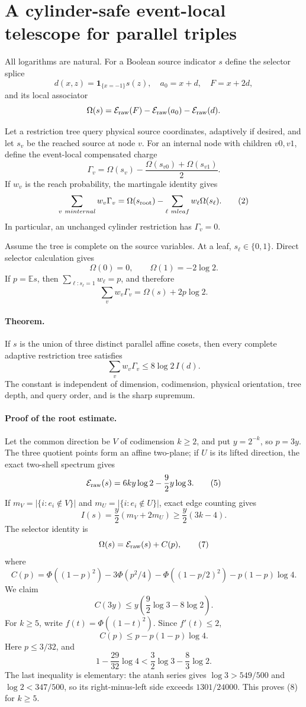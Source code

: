 \section*{A cylinder-safe event-local telescope for parallel triples}

All logarithms are natural.  For a Boolean source indicator $s$ define the
selector splice
\[
 d(x,z)=\mathbf1_{\{x=-1\}}s(z),\quad a_0=x+d,\quad F=x+2d,
\]
and its local associator
\[
 \Omega(s)=\mathcal E_{\rm raw}(F)
 -\mathcal E_{\rm raw}(a_0)-\mathcal E_{\rm raw}(d).
\]

Let a restriction tree query physical source coordinates, adaptively if
desired, and let $s_v$ be the reached source at node $v$.  For an internal
node with children $v0,v1$, define the event-local compensated charge
\[
 \Gamma_v=\Omega(s_v)-\frac{\Omega(s_{v0})+\Omega(s_{v1})}{2}. \tag{1}
\]
If $w_v$ is the reach probability, the martingale identity gives
\[
 \sum_{v\ {
m internal}}w_v\Gamma_v
 =\Omega(s_{\rm root})-\sum_{\ell\ {
m leaf}}w_\ell\Omega(s_\ell).
                                                                    \tag{2}
\]
In particular, an unchanged cylinder restriction has $\Gamma_v=0$.

Assume the tree is complete on the source variables.  At a leaf,
$s_\ell\in\{0,1\}$.  Direct selector calculation gives
\[
 \Omega(0)=0,\qquad \Omega(1)=-2\log2.
\]
If $p=\mathbb E s$, then $\sum_{\ell:s_\ell=1}w_\ell=p$, and therefore
\[
 \sum_vw_v\Gamma_v=\Omega(s)+2p\log2.                \tag{3}
\]

\paragraph{Theorem.}
If $s$ is the union of three distinct parallel affine cosets, then every
complete adaptive restriction tree satisfies
\[
 \boxed{\sum_vw_v\Gamma_v\le8\log2\,I(d).}          \tag{4}
\]
The constant is independent of dimension, codimension, physical orientation,
tree depth, and query order, and is the sharp supremum.

\paragraph{Proof of the root estimate.}
Let the common direction be $V$ of codimension $k\ge2$, and put
$y=2^{-k}$, so $p=3y$.  The three quotient points form an affine two-plane;
if $U$ is its lifted direction, the exact two-shell spectrum gives
\[
 \mathcal E_{\rm raw}(s)=6ky\log2-\frac92y\log3.     \tag{5}
\]
If $m_V=|\{i:e_i\notin V\}|$ and
$m_U=|\{i:e_i\notin U\}|$, exact edge counting gives
\[
 I(s)=\frac y2(m_V+2m_U)\ge\frac y2(3k-4).             \tag{6}
\]
The selector identity is
\[
 \Omega(s)=\mathcal E_{\rm raw}(s)+C(p),               \tag{7}
\]
where
\[
 C(p)=\Phi((1-p)^2)-3\Phi(p^2/4)-\Phi((1-p/2)^2)
      -p(1-p)\log4.
\]
We claim
\[
 C(3y)\le y\left(\frac92\log3-8\log2\right).        \tag{8}
\]
For $k\ge5$, write $f(t)=\Phi((1-t)^2)$.  Since $f'(t)\le2$,
\[
 C(p)\le p-p(1-p)\log4.
\]
Here $p\le3/32$, and
\[
 1-\frac{29}{32}\log4
 <\frac32\log3-\frac83\log2.
\]
The last inequality is elementary: the atanh series gives
$\log3>549/500$ and $\log2<347/500$, so its right-minus-left side exceeds
$1301/24000$.  This proves (8) for $k\ge5$.

